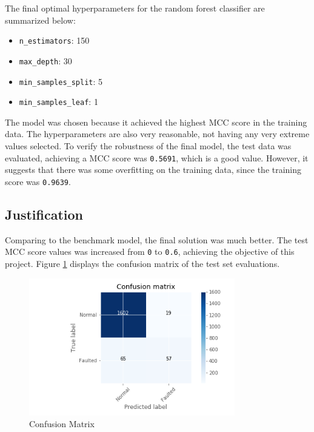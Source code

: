 \documentclass[11pt]{article}
\providecommand{\tightlist}{%
      \setlength{\itemsep}{0pt}\setlength{\parskip}{0pt}}
\begin{document}
The final optimal hyperparameters for the random forest classifier are
summarized below:

\begin{itemize}
\tightlist
\item
  \texttt{n\_estimators}: 150
\item
  \texttt{max\_depth}: 30
\item
  \texttt{min\_samples\_split}: 5
\item
  \texttt{min\_samples\_leaf}: 1
\end{itemize}

The model was chosen because it achieved the highest MCC score in the
training data. The hyperparameters are also very reasonable, not having
any very extreme values selected. To verify the robustness of the final
model, the test data was evaluated, achieving a MCC score was
\texttt{0.5691}, which is a good value. However, it suggests that there
was some overfitting on the training data, since the training score was
\texttt{0.9639}.

\hypertarget{justification}{%
\subsection{Justification}\label{justification}}

Comparing to the benchmark model, the final solution was much better.
The test MCC score values was increased from \texttt{0} to \texttt{0.6},
achieving the objective of this project. Figure \ref{fig:confusion_matrix}  displays the
confusion matrix of the test set evaluations.

\begin{figure}[h]
\centering
\includegraphics[width=0.8\textwidth]{cnf_matrix_testset.png}
\caption{Confusion Matrix}
\label{fig:confusion_matrix}
\end{figure}
\end{document}
